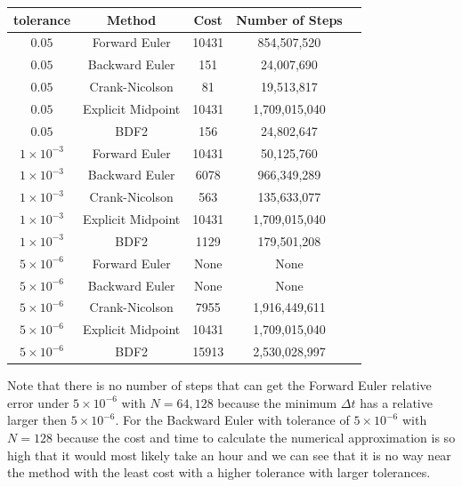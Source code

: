 \documentclass[12pt,answers]{exam}
\begin{document}
    \begin{center}
        \begin{tabular}{|c|c|c|c|c|} \hline
           tolerance & Method & Cost & Number of Steps \\ \hline
           $0.05$ & Forward Euler & 10431 & 854,507,520 \\  \hline
           $0.05$ & Backward Euler & 151 & 24,007,690 \\ \hline
           \rowcolor{yellow!30} $0.05$ & Crank-Nicolson & 81 & 19,513,817 \\ \hline
           $0.05$ & Explicit Midpoint & 10431 & 1,709,015,040 \\ \hline
           $0.05$ & BDF2 & 156 & 24,802,647 \\ \hline
           \rowcolor{yellow!30} $1\times10^{-3}$ & Forward Euler & 10431 & 50,125,760 \\ \hline
           $1\times10^{-3}$ & Backward Euler & 6078 & 966,349,289 \\ \hline
           $1\times10^{-3}$ & Crank-Nicolson & 563 & 135,633,077 \\ \hline
           $1\times10^{-3}$ & Explicit Midpoint & 10431 & 1,709,015,040 \\ \hline
           $1\times10^{-3}$ & BDF2 & 1129 & 179,501,208 \\ \hline
           $5\times10^{-6}$ & Forward Euler & None & None \\ \hline
           $5\times10^{-6}$ & Backward Euler & None & None \\ \hline
           $5\times10^{-6}$ & Crank-Nicolson & 7955 & 1,916,449,611 \\ \hline
           \rowcolor{yellow!30} $5\times10^{-6}$ & Explicit Midpoint & 10431 & 1,709,015,040 \\ \hline
           $5\times10^{-6}$ & BDF2 & 15913 & 2,530,028,997 \\ \hline
        \end{tabular}
    \end{center}
    Note that there is no number of steps that can get the Forward Euler relative error under $5 \times 10^{-6}$ with $N = 64, 128$ because the minimum $\Delta t$ has a relative larger then $5 \times 10^{-6}$. For the Backward Euler with tolerance of $5 \times 10^{-6}$ with $N = 128$ because the cost and time to calculate the numerical approximation is so high that it would most likely take an hour and we can see that it is no way near the method with the least cost with a higher tolerance with larger tolerances.
\end{document}
